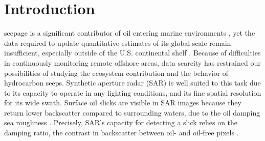 \documentclass[lettersize,journal]{IEEEtran}
\begin{document}
\section{Introduction}
 seepage is a significant contributor of oil entering marine environments \cite{kvenvoldenNaturalSeepageCrude2003}, yet the data required to update quantitative
estimates of its global scale remain insufficient, especially outside of the U.S. continental shelf \cite{nationalacademiesofsciencesengineeringandmedicineOilSeaIV2022}. Because of difficulties in continuously monitoring 
remote offshore areas, data scarcity has restrained our possibilities of studying the ecosystem contribution and the behavior of hydrocarbon seeps. 
Synthetic aperture radar (SAR) is well suited to this task due to its capacity to operate in any lighting conditions, and its fine spatial resolution for its wide swath. 
Surface oil slicks are visible in SAR images because they return lower backscatter compared to surrounding waters, due to the oil damping sea roughness \cite{brekkeSAROilSpill2020,fingasReviewOilSpill2018,alpersOilsSurfactants2004}.
Precisely, SAR's capacity for detecting a slick relies on the damping ratio, the contrast in backscatter between oil- and oil-free pixels \cite{hovlandSlickDetectionSAR1994,
quigleyInvestigationDampingRatio2023}.
\end{document}
